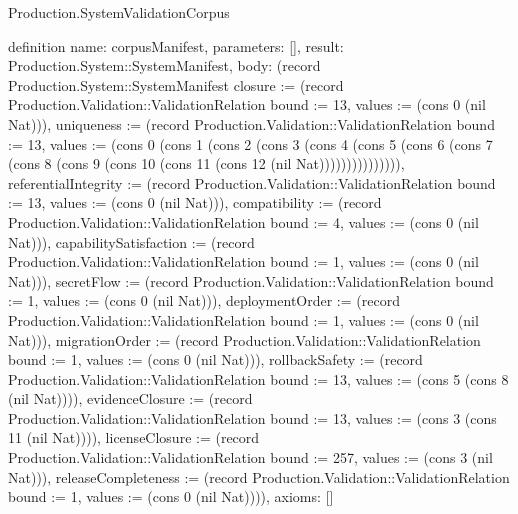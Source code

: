 \begin{lexlean}{Production.SystemValidationCorpus}
\begin{semanticmodule}
definition{
  name: corpusManifest,
  parameters: [],
  result: Production.System::SystemManifest,
  body: (record Production.System::SystemManifest {closure := (record Production.Validation::ValidationRelation {bound := 13, values := (cons 0 (nil Nat))}), uniqueness := (record Production.Validation::ValidationRelation {bound := 13, values := (cons 0 (cons 1 (cons 2 (cons 3 (cons 4 (cons 5 (cons 6 (cons 7 (cons 8 (cons 9 (cons 10 (cons 11 (cons 12 (nil Nat))))))))))))))}), referentialIntegrity := (record Production.Validation::ValidationRelation {bound := 13, values := (cons 0 (nil Nat))}), compatibility := (record Production.Validation::ValidationRelation {bound := 4, values := (cons 0 (nil Nat))}), capabilitySatisfaction := (record Production.Validation::ValidationRelation {bound := 1, values := (cons 0 (nil Nat))}), secretFlow := (record Production.Validation::ValidationRelation {bound := 1, values := (cons 0 (nil Nat))}), deploymentOrder := (record Production.Validation::ValidationRelation {bound := 1, values := (cons 0 (nil Nat))}), migrationOrder := (record Production.Validation::ValidationRelation {bound := 1, values := (cons 0 (nil Nat))}), rollbackSafety := (record Production.Validation::ValidationRelation {bound := 13, values := (cons 5 (cons 8 (nil Nat)))}), evidenceClosure := (record Production.Validation::ValidationRelation {bound := 13, values := (cons 3 (cons 11 (nil Nat)))}), licenseClosure := (record Production.Validation::ValidationRelation {bound := 257, values := (cons 3 (nil Nat))}), releaseCompleteness := (record Production.Validation::ValidationRelation {bound := 1, values := (cons 0 (nil Nat))})}),
  axioms: []
}


\end{semanticmodule}
\end{lexlean}
